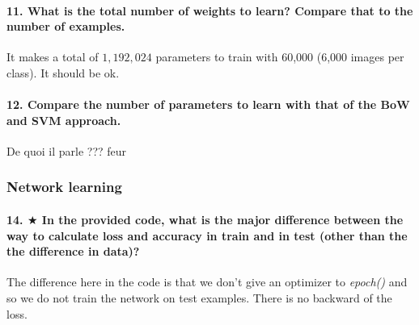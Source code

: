 \documentclass{article}
\theoremstyle{plain}%
\theoremstyle{definition}
\theoremstyle{remark}
\begin{document}
\paragraph{11. What is the total number of weights to learn? Compare that to the number of examples.}
It makes a total of $ 1,192,024 $ parameters to train with 60,000 (6,000 images per class). It should be ok.

\paragraph{12. Compare the number of parameters to learn with that of the BoW and SVM approach.}
De quoi il parle ??? feur

\subsubsection{Network learning}
\paragraph{14. $ \bigstar $ In the provided code, what is the major difference between the way to calculate loss and accuracy in train and in test (other than the the difference in data)?}
The difference here in the code is that we don't give an optimizer to \textit{epoch()} and so we do not train the network on test examples. There is no backward of the loss.
\end{document}
